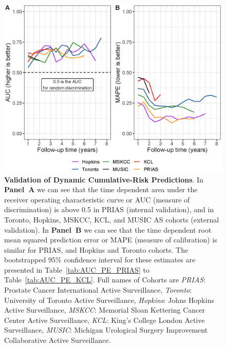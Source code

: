 \begin{figure}[!htb]
\centerline{\includegraphics[width=\columnwidth]{images/auc_pe_recalib.eps}}
\caption{\textbf{Validation of Dynamic Cumulative-Risk Predictions}. In \textbf{Panel~A} we can see that the time dependent area under the receiver operating characteristic curve or AUC (measure of discrimination) is above 0.5 in PRIAS (internal validation), and in Toronto, Hopkins, MSKCC, KCL, and MUSIC AS cohorts (external validation). In \textbf{Panel~B} we can see that the time dependent root mean squared prediction error or MAPE (measure of calibration) is similar for PRIAS, and Hopkins and Toronto cohorts. The bootstrapped 95\% confidence interval for these estimates are presented in Table~\ref{tab:AUC_PE_PRIAS} to Table~\ref{tab:AUC_PE_KCL}. Full names of Cohorts are \textit{PRIAS}: Prostate Cancer International Active Surveillance, \textit{Toronto}: University of Toronto Active Surveillance, \textit{Hopkins}: Johns Hopkins Active Surveillance, \textit{MSKCC}: Memorial Sloan Kettering Cancer Center Active Surveillance, \textit{KCL}: King's College London Active Surveillance, \textit{MUSIC}: Michigan Urological Surgery Improvement Collaborative Active Surveillance.}
\label{fig:auc_pe_recalib}
\end{figure}

